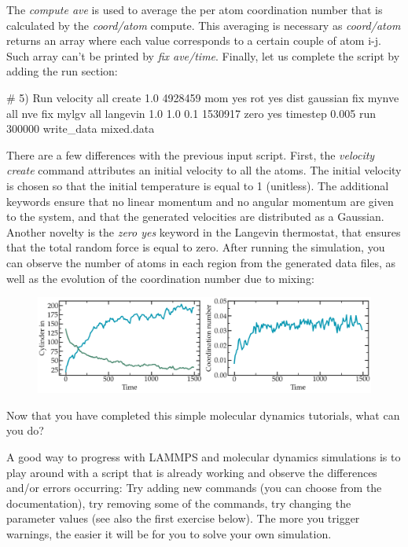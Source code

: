 \noindent The \textit{compute ave} is used to average the per atom
coordination number that is calculated by the \textit{coord/atom} compute.
This averaging is necessary as \textit{coord/atom} returns an array where each value corresponds 
to a certain couple of atom i-j. Such array can't be printed by \textit{fix ave/time}. 
Finally, let us complete the script by adding the run section:

\begin{lcverbatim}
# 5) Run
velocity all create 1.0 4928459 mom yes rot yes dist gaussian
fix mynve all nve
fix mylgv all langevin 1.0 1.0 0.1 1530917 zero yes
timestep 0.005
run 300000
write_data mixed.data
\end{lcverbatim}

\noindent There are a few differences with the
previous input script. First, the \textit{velocity create}
command attributes an initial velocity to all the atoms.
The initial velocity is chosen so that the initial
temperature is equal to 1 (unitless). The additional
keywords ensure that no linear momentum and no angular
momentum are given to the system, and that the generated
velocities are distributed as a Gaussian. Another novelty
is the \textit{zero yes} keyword in the Langevin thermostat, that
ensures that the total random force is equal to zero.
After running the simulation, you can observe the number
of atoms in each region from the generated data files, as
well as the evolution of the coordination number due to
mixing:

\begin{figure}
\includegraphics[width=\linewidth]{tutorials/level0/lennard-jones-fluid/population-light.png}
\end{figure}

Now that you have completed this simple molecular dynamics tutorials, what can you do?

A good way to progress with LAMMPS and molecular dynamics
simulations is to play around with a script that is already
working and observe the differences and/or errors occurring:
Try adding new commands (you can choose from the documentation),
try removing some of the commands, try changing the parameter values
(see also the first exercise below).
The more you trigger warnings, the easier it will be for you to solve your
own simulation.


